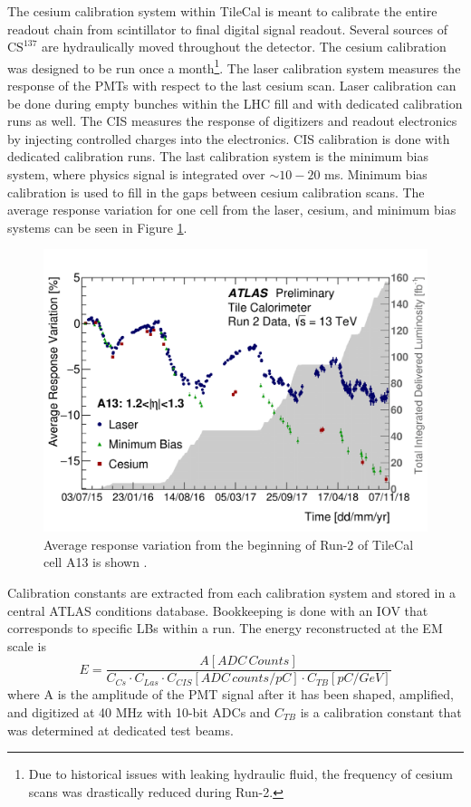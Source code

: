 		The cesium calibration system within \gls{TileCal} is meant to calibrate the entire readout chain from scintillator to final digital signal readout. Several sources of $\mathrm{CS}^{137}$ are hydraulically moved throughout the detector. The cesium calibration was designed to be run once a month\footnote{Due to historical issues with leaking hydraulic fluid, the frequency of cesium scans was drastically reduced during Run-2.}. The laser calibration system measures the response of the \glspl{PMT} with respect to the last cesium scan. Laser calibration can be done during empty bunches within the \gls{LHC} fill and with dedicated calibration runs as well. The \gls{CIS} measures the response of digitizers and readout electronics by injecting controlled charges into the electronics. \gls{CIS} calibration is done with dedicated calibration runs. The last calibration system is the minimum bias system, where physics signal is integrated over $\sim 10 - 20 $ ms. Minimum bias calibration is used to fill in the gaps between cesium calibration scans. The average response variation for one cell from the laser, cesium, and minimum bias systems can be seen in Figure \ref{fig:tile-calib-a13}. 

		\begin{figure}
			\centering
			\includegraphics[width=.75\textwidth,keepaspectratio=true]{appendices/images/A13_run2.png}
			\caption{\label{fig:tile-calib-a13} Average response variation from the beginning of Run-2 of \gls{TileCal} cell A13 is shown \cite{Tile-Run2-perf}. }
		\end{figure}

		Calibration constants are extracted from each calibration system and stored in a central ATLAS conditions database. Bookkeeping is done with an \gls{IOV} that corresponds to specific \glspl{LB} within a run. The energy reconstructed at the \gls{EM} scale is 
		\begin{equation}
		E = \frac{A [ADC \, Counts]}{ C_{Cs} \cdot C_{Las} \cdot C_{CIS} [ADC \, counts/pC] \cdot C_{TB} [pC/GeV] }
		\end{equation}
		where A is the amplitude of the PMT signal after it has been shaped, amplified, and digitized at 40 MHz with 10-bit \glspl{ADC} and $C_{TB}$ is a calibration constant that was determined at dedicated test beams.


